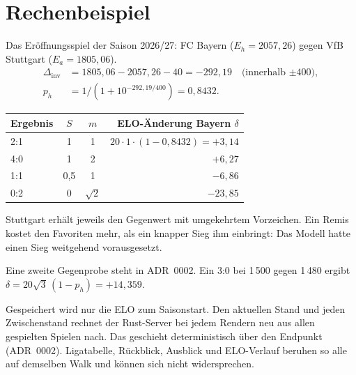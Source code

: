 \section{Rechenbeispiel}\label{sec:elo-beispiel}

Das Eröffnungsspiel der Saison 2026/27: FC Bayern ($E_h = 2057{,}26$) gegen
VfB Stuttgart ($E_a = 1805{,}06$).
\begin{align*}
  \Delta_{\text{inv}} &= 1805{,}06 - 2057{,}26 - 40 = -292{,}19
    \quad\text{(innerhalb $\pm 400$)},\\
  p_h &= 1/(1 + 10^{-292{,}19/400}) = 0{,}8432.
\end{align*}

\begin{center}
\begin{tabular}{@{}lccr@{}}
\toprule
Ergebnis & $S$ & $m$ & ELO-Änderung Bayern $\delta$ \\
\midrule
2:1 & 1   & 1          & $20 \cdot 1 \cdot (1 - 0{,}8432) = +3{,}14$ \\
4:0 & 1   & 2          & $+6{,}27$ \\
1:1 & 0{,}5 & 1        & $-6{,}86$ \\
0:2 & 0   & $\sqrt2$   & $-23{,}85$ \\
\bottomrule
\end{tabular}
\end{center}

Stuttgart erhält jeweils den Gegenwert mit umgekehrtem Vorzeichen. Ein Remis
kostet den Favoriten mehr, als ein knapper Sieg ihm einbringt: Das Modell
hatte einen Sieg weitgehend vorausgesetzt.

Eine zweite Gegenprobe steht in ADR~0002. Ein 3:0 bei 1\,500 gegen 1\,480
ergibt $\delta = 20\sqrt3\,(1 - p_h) = +14{,}359$.

\begin{merke}
Gespeichert wird nur die ELO zum Saisonstart. Den aktuellen Stand und jeden
Zwischenstand rechnet der Rust-Server bei jedem Rendern neu aus allen
gespielten Spielen nach. Das geschieht deterministisch über den Endpunkt
 (ADR~0002). Ligatabelle, Rückblick, Ausblick und
ELO-Verlauf beruhen so alle auf demselben Walk und können sich nicht
widersprechen.
\end{merke}
